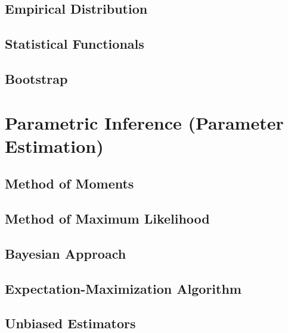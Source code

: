 \documentclass[
  openany]{book}
\begin{document}
\hypertarget{empirical-distribution}{%
\section{Empirical Distribution}\label{empirical-distribution}}

\hypertarget{statistical-functionals}{%
\section{Statistical Functionals}\label{statistical-functionals}}

\hypertarget{bootstrap}{%
\section{Bootstrap}\label{bootstrap}}

\hypertarget{parametric-inference-parameter-estimation}{%
\chapter{Parametric Inference (Parameter Estimation)}\label{parametric-inference-parameter-estimation}}

\hypertarget{method-of-moments}{%
\section{Method of Moments}\label{method-of-moments}}

\hypertarget{method-of-maximum-likelihood}{%
\section{Method of Maximum Likelihood}\label{method-of-maximum-likelihood}}

\hypertarget{bayesian-approach}{%
\section{Bayesian Approach}\label{bayesian-approach}}

\hypertarget{expectation-maximization-algorithm}{%
\section{Expectation-Maximization Algorithm}\label{expectation-maximization-algorithm}}

\hypertarget{unbiased-estimators}{%
\section{Unbiased Estimators}\label{unbiased-estimators}}
\end{document}

